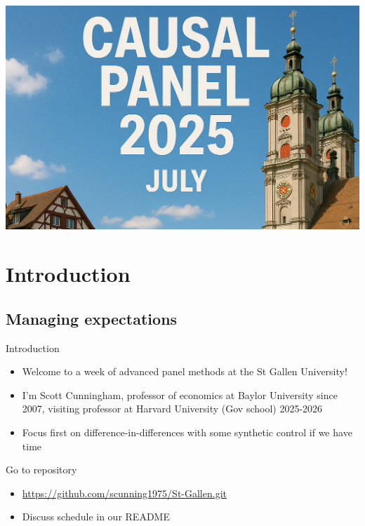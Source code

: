 \documentclass{beamer}
\begin{document}
\begin{frame}[plain]  %
\vfill
\begin{center}
  \includegraphics[width=0.85\linewidth]{./lecture_includes/banner_cropped}
\end{center}
\vfill
\end{frame}


\section{Introduction}

\subsection{Managing expectations}


\begin{frame}{Introduction}

\begin{itemize}
\item Welcome to a week of advanced panel methods at the St Gallen University!
\item I'm Scott Cunningham, professor of economics at Baylor University since 2007, visiting professor at Harvard University (Gov school) 2025-2026
\item Focus first on difference-in-differences with some synthetic control if we have time
\end{itemize}

\end{frame}

\begin{frame}{Go to repository}

\begin{itemize}
\item \url{https://github.com/scunning1975/St-Gallen.git}
\item Discuss schedule in our README
\end{itemize}

\end{frame}
\end{document}

